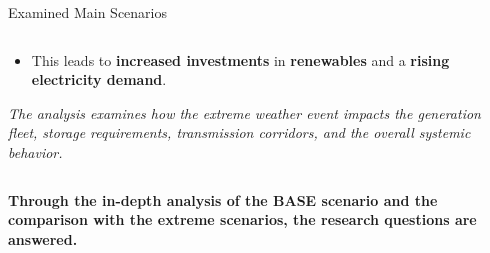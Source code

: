 \documentclass[aspectratio=169]{beamer}
\begin{document}
\begin{frame}{Examined Main Scenarios}
\begin{columns}
\begin{column}{0.32\textwidth}
\begin{coloredblock}
\begin{minipage}[t][2cm]{0.9\textwidth}
                    \begin{itemize}
                        \item \scriptsize This leads to \textbf{increased investments} in \textbf{renewables} and a \textbf{rising electricity demand}.
                    \end{itemize}
                \end{minipage}
                \begin{minipage}[t][3.7cm]{0.9\textwidth} 
                    \scriptsize \textit{The analysis examines how the extreme weather event impacts the generation fleet, storage requirements, transmission corridors, and the overall systemic behavior.}
                \end{minipage}
            \end{coloredblock}
        \end{column}
    \end{columns}

    \vspace{0.2cm}
    \begin{coloredblock}[grey]
        \centering
        \footnotesize\textbf{Through the in-depth analysis of the BASE scenario and the comparison with the extreme scenarios, the research questions are answered.}
    \end{coloredblock}

\end{frame}
\end{document}
